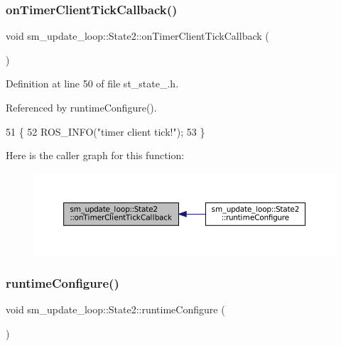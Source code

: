 \subsubsection{\texorpdfstring{on\+Timer\+Client\+Tick\+Callback()}{onTimerClientTickCallback()}}
{\footnotesize\ttfamily void sm\+\_\+update\+\_\+loop\+::\+State2\+::on\+Timer\+Client\+Tick\+Callback (\begin{DoxyParamCaption}{ }\end{DoxyParamCaption})\hspace{0.3cm}{\ttfamily [inline]}}



Definition at line 50 of file st\+\_\+state\+\_.\+h.



Referenced by runtime\+Configure().


\begin{DoxyCode}
51     \{
52         ROS\_INFO(\textcolor{stringliteral}{"timer client tick!"});
53     \}
\end{DoxyCode}
Here is the caller graph for this function\+:
\nopagebreak
\begin{figure}[H]
\begin{center}
\leavevmode
\includegraphics[width=350pt]{structsm__update__loop_1_1State2_a6de20c89117e60923ba556bedeb0d231_icgraph}
\end{center}
\end{figure}
\mbox{\label{structsm__update__loop_1_1State2_ad817c7ed319628e2794a05bb6aa10921}} 
\subsubsection{\texorpdfstring{runtime\+Configure()}{runtimeConfigure()}}
{\footnotesize\ttfamily void sm\+\_\+update\+\_\+loop\+::\+State2\+::runtime\+Configure (\begin{DoxyParamCaption}{ }\end{DoxyParamCaption})\hspace{0.3cm}{\ttfamily [inline]}}



